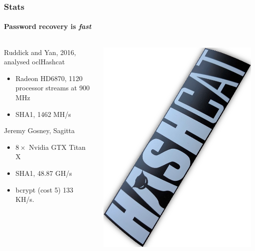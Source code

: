 \documentclass[handout, notes=hide]{beamer}
\begin{document}

\begin{frame}
\frametitle{Stats}
\framesubtitle{Password recovery is {\it fast}}
\setlength{\parskip}{0.5em}

\begin{columns}[T]
\begin{column}[T]{0.6\textwidth}
\setlength{\parskip}{0.5em}
Ruddick and Yan, 2016, analysed oclHashcat
\begin{itemize}
\item Radeon HD6870, 1120 processor streams at 900 MHz
\item SHA1, 1462 MH/s
\end{itemize}

Jeremy Gosney, Sagitta

\begin{itemize}
\item $8 \times$ Nvidia GTX Titan X
\item SHA1, 48.87 GH/s
\item bcrypt (cost 5) 133 KH/s.
\end{itemize}


\end{column}
\begin{column}[T]{0.4\textwidth}
\vspace{0.0em}
\includegraphics[width=1.0\textwidth]{hashcat}
\end{column}
\end{columns}


\end{frame}
\end{document}
